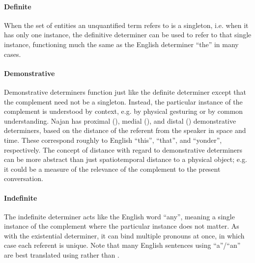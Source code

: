 \paragraph{Definite} When the set of entities an unquantified term refers to is
a singleton, i.e. when it has only one instance, the definitive determiner
 can be used to refer to that single instance, functioning much the
same as the English determiner ``the'' in many cases.



\paragraph{Demonstrative} Demonstrative determiners function just like the
definite determiner except that the complement need not be a singleton. Instead,
the particular instance of the complement is understood by context, e.g. by
physical gesturing or by common understanding. Najan has proximal
(), medial (), and distal () demonstrative
determiners, based on the distance of the referent from the speaker in space and
time. These correspond roughly to English ``this'', ``that'', and ``yonder'',
respectively. The concept of distance with regard to demonstrative determiners
can be more abstract than just spatiotemporal distance to a physical object;
e.g. it could be a measure of the relevance of the complement to the present
conversation.

\paragraph{Indefinite} The indefinite determiner  acts like the
English word ``any'', meaning a single instance of the complement where the
particular instance does not matter. As with the existential determiner, it can
bind multiple pronouns at once, in which case each referent is unique. Note that
many English sentences using ``a''/``an'' are best translated using 
rather than .


